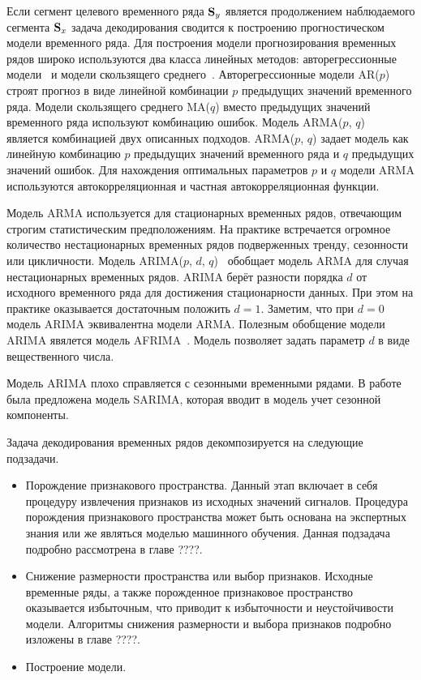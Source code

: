 Если сегмент целевого временного ряда $\mathbf{S}_y$ является продолжением наблюдаемого сегмента $\mathbf{S}_x$ задача декодирования сводится к построению прогностическом модели временного ряда.
Для построения модели прогнозирования временных рядов широко используются два класса линейных методов: авторегрессионные модели~\cite{box2011time,hipel1994time} и модели скользящего среднего~\cite{box2011time,hipel1994time}. 
Авторегрессионные модели AR($p$) строят прогноз в виде линейной комбинации $p$ предыдущих значений временного ряда.
Модели скользящего среднего MA($q$) вместо предыдущих значений временного ряда используют комбинацию ошибок.
Модель ARMA($p$, $q$)~\cite{cochrane2005time} является комбинацией двух описанных подходов. 
ARMA($p$, $q$) задает модель как линейную комбинацию $p$ предыдущих значений временного ряда и $q$ предыдущих значений ошибок. 
Для нахождения оптимальных параметров $p$ и $q$ модели ARMA используются автокорреляционная и частная автокорреляционная функции. 

Модель ARMA используется для стационарных временных рядов, отвечающим строгим статистическим предположениям. 
На практике встречается огромное количество нестационарных временных рядов подверженных тренду, сезонности или цикличности.
Модель ARIMA($p$, $d$, $q$)~\cite{cochrane2005time} обобщает модель ARMA для случая нестационарных временных рядов.
ARIMA берёт разности порядка $d$ от исходного временного ряда для достижения стационарности данных. 
При этом на практике оказывается достаточным положить $d = 1$.
Заметим, что при $d = 0$ модель ARIMA эквивалентна модели ARMA. 
Полезным обобщение модели ARIMA явялется модель AFRIMA~\cite{galbraith2001autoregression}. 
Модель позволяет задать параметр $d$ в виде вещественного числа.

Модель ARIMA плохо справляется с сезонными временными рядами.
В работе~\cite{box2011time} была предложена модель SARIMA, которая вводит в модель учет сезонной компоненты.

Задача декодирования временных рядов декомпозируется на следующие подзадачи.
\begin{itemize}
	\item Порождение признакового пространства. 
	Данный этап включает в себя процедуру извлечения признаков из исходных значений сигналов. 
	Процедура порождения признакового пространства может быть основана на экспертных знания или же являться моделью машинного обучения. 
	Данная подзадача подробно рассмотрена в главе {\color{red} ????}.
	
	\item Снижение размерности пространства или выбор признаков. 
	Исходные временные ряды, а также порожденное признаковое пространство оказывается избыточным, что приводит к избыточности и неустойчивости модели. 
	Алгоритмы снижения размерности и выбора признаков подробно изложены в главе {\color{red} ????}.
	
	\item Построение модели.
\end{itemize}

